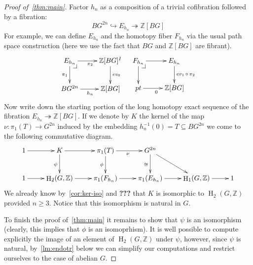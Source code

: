 \documentclass[oneside, 12pt]{amsart}
\makeatletter
\theoremstyle{plain}
\numberwithin{equation}{section}
\numberwithin{lemma}{section}
\theoremstyle{remark}
\theoremstyle{definition}
\DeclareMathOperator{\HH}{H}
\newcommand{\ZZ}{\mathbb{Z}}
\newcommand{\pullbackcorner}[1][dr]{\save*!/#1-1.2pc/#1:(-1,1)@^{|-}\restore}
\makeatother
\begin{document}
\begin{proof}[Proof of~\cref{thm:main}]
Factor $h_n$ as a composition of a trivial cofibration followed by a fibration: 
\begin{equation} \label{eq:fibr-repl} BG^{2n} \hookrightarrow E_{h_n} \twoheadrightarrow \ZZ[BG] \end{equation}
For example, we can define $E_{h_n}$ and the homotopy fiber $F_{h_n}$ via the usual path space construction
 (here we use the fact that $BG$ and $\ZZ[BG]$ are fibrant).
\[ \xymatrix{ E_{h_n}  \ar[r]_{\pi_2} \ar[d]_{\pi_1} \pullbackcorner & \ar[d]^{ev_0} \ZZ[BG]^I\\
              BG^{2n} \ar[r]_{h_n} & \ZZ[BG] } \ \ \ 
   \xymatrix{ F_{h_n}  \ar[r] \ar[d] \pullbackcorner & \ar[d]^{ev_1\,\circ\,\pi_2} E_{h_n} \\
              pt \ar[r]_{0} & \ZZ[BG]}  \]
Now write down the starting portion of the long homotopy exact sequence of the fibration $E_{h_n} \twoheadrightarrow \ZZ[BG]$.
If we denote by $K$ the kernel of  the map $\nu\colon \pi_1(T) \to G^{2n}$ induced by the embedding $h_n^{-1}(0)=T \subseteq BG^{2n}$ we 
 come to the following commutative diagram.
\[ \xymatrix{1 \ar[r] & K       \ar[d]_{\psi} \ar[r] & \pi_1(T) \ar[d]_{\phi} \ar[r]_{\nu}     & G^{2n} \ar[rd] \ar[d]_{\cong} &                      & \\
             1 \ar[r] & \HH_2(G, \ZZ) \ar[r] & \pi_1(F_{h_n})           \ar[r]  & \pi_1(E_{h_n}) \ar[r]  & \HH_1(G, \ZZ) \ar[r] & 1}\]
We already know by~\cref{cor:ker-iso} and {\bf ???} that $K$ is isomorphic to $\HH_2(G, \ZZ)$ provided $n\geq 3$.
Notice that this isomorphism is natural in $G$.

To finish the proof of~\cref{thm:main} it remains to show that $\psi$ is an isomorphism (clearly, this implies that $\phi$ is an isomoprhism).
It is well possible to compute explicitly the image of an element of $\HH_2(G, \ZZ)$ under $\psi$, however, since $\psi$ is natural,
 by~\cref{lm:endotr} below we can simplify our computations and restrict ourselves to the case of abelian $G$.

\end{proof}
\end{document}
